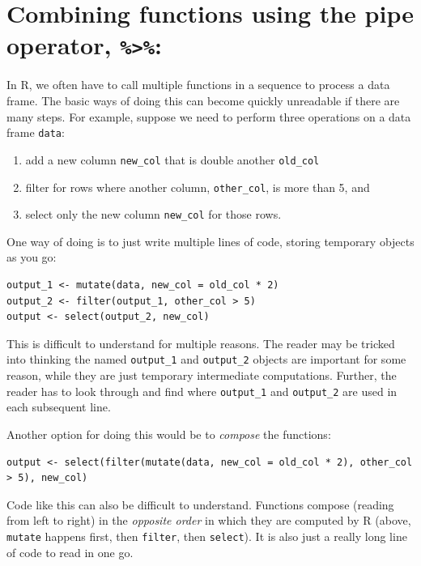 \documentclass[
]{krantz}
\providecommand{\tightlist}{%
  \setlength{\itemsep}{0pt}\setlength{\parskip}{0pt}}
\begin{document}
\hypertarget{combining-functions-using-the-pipe-operator}{%
\section{\texorpdfstring{Combining functions using the pipe operator, \texttt{\%\textgreater{}\%}:}{Combining functions using the pipe operator, \%\textgreater\%:}}\label{combining-functions-using-the-pipe-operator}}

In R, we often have to call multiple functions in a sequence to process a data frame. The basic ways of doing this can become quickly unreadable if there are many steps. For example, suppose we need to perform three operations on
a data frame \texttt{data}:

\begin{enumerate}
\def\labelenumi{\arabic{enumi})}
\tightlist
\item
  add a new column \texttt{new\_col} that is double another \texttt{old\_col}
\item
  filter for rows where another column, \texttt{other\_col}, is more than 5, and
\item
  select only the new column \texttt{new\_col} for those rows.
\end{enumerate}

One way of doing is to just write multiple lines of code, storing temporary objects as you go:

\begin{verbatim}
output_1 <- mutate(data, new_col = old_col * 2)
output_2 <- filter(output_1, other_col > 5)
output <- select(output_2, new_col)
\end{verbatim}

This is difficult to understand for multiple reasons. The reader may be tricked into thinking the named \texttt{output\_1} and \texttt{output\_2}
objects are important for some reason, while they are just temporary intermediate computations. Further, the reader has to look
through and find where \texttt{output\_1} and \texttt{output\_2} are used in each subsequent line.

Another option for doing this would be to \emph{compose} the functions:

\begin{verbatim}
output <- select(filter(mutate(data, new_col = old_col * 2), other_col > 5), new_col)
\end{verbatim}

Code like this can also be difficult to understand. Functions compose (reading from left to right) in the \emph{opposite order} in which
they are computed by R (above, \texttt{mutate} happens first, then \texttt{filter}, then \texttt{select}). It is also just a really long line of code
to read in one go.
\end{document}
